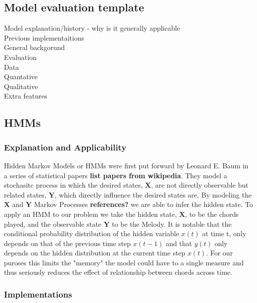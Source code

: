 \subsection{Model evaluation template}
Model explanation/history - why is it generally applicable \\
Previous implementaitions \\
    General backgorund \\
    Evaluation \\
        Data \\
        Quantative \\
        Qualitative \\
        Extra features \\
\subsection{HMMs}

\subsubsection{Explanation and Applicability}
Hidden Markov Models or HMMs were first put forward by Leonard E. Baum in a series of statistical papers \textbf{list papers from wikipedia}. 
They model a stochasitc process in which the desired states, $\boldsymbol{X}$, are not directly observable but related states, $\boldsymbol{Y}$, which directly influence the desired states are. 
By modeling the $\boldsymbol{X}$ and $\boldsymbol{Y}$ Markov Processes \textbf{references?} we are able to infer the hidden state.
To apply an HMM to our problem we take the hidden state, $\boldsymbol{X}$, to be the chords played, and the observable state $\boldsymbol{Y}$ to be the Melody.
It is notable that the conditional probability distribution of the hidden variable $x(t)$ at time t, only depends on that of the previous time step $x(t-1)$ and that $y(t)$ only depends on the hidden distribution at the current time step $x(t)$.
For our puroses this limits the "memory" the model could have to a single measure and thus seriously reduces the effect of relationship between chords across time.

\subsubsection{Implementations}

